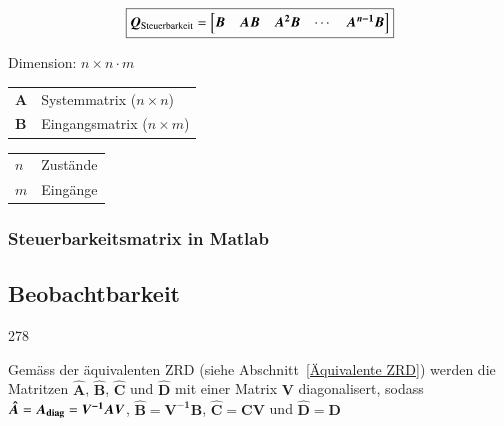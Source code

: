 \begin{minipage}[c]{0.6\columnwidth}
    $$ \boxed{ \bm{Q}_{\rm Steuerbarkeit} = 
    \begin{bmatrix}
        \bm{B} & \bm{A B} & \bm{A^2 B} & \cdots & \bm{A^{n-1} B} 
    \end{bmatrix} } $$
\end{minipage}
\hfill
\begin{minipage}[c]{0.38\columnwidth}
    Dimension: $n \times n \cdot m$
\end{minipage}


\begin{minipage}[c]{0.48\columnwidth}
    \begin{tabular}{ll}
        $\bm{A}$    & Systemmatrix ($n \times n$) \\
        $\bm{B}$    & Eingangsmatrix ($n \times m$) \\
    \end{tabular}
\end{minipage}
\hfill
\begin{minipage}[c]{0.48\columnwidth}
    \begin{tabular}{ll}
        $n$         & Zustände \\
        $m$         & Eingänge \\
    \end{tabular}
\end{minipage}


\subsubsection*{Steuerbarkeitsmatrix in Matlab}




\subsection{Beobachtbarkeit}{278}

Gemäss der äquivalenten ZRD (siehe Abschnitt~\ref{Äquivalente ZRD}) werden die Matritzen $\bm{\hat{A}}$,
$\bm{\hat{B}}$, $\bm{\hat{C}}$ und $\bm{\hat{D}}$ mit einer Matrix $\bm{V}$ diagonalisert, sodass 
$\bm{\hat{A}} = \bm{A_{\rm diag}} = \bm{V^{-1} A V}$, $\bm{\hat{B}} = \bm{V^{-1} B}$, 
$\bm{\hat{C}} = \bm{C V}$ und $\bm{\hat{D}} = \bm{D}$

\vspace{0.2cm}

\vspace{0.2cm}


